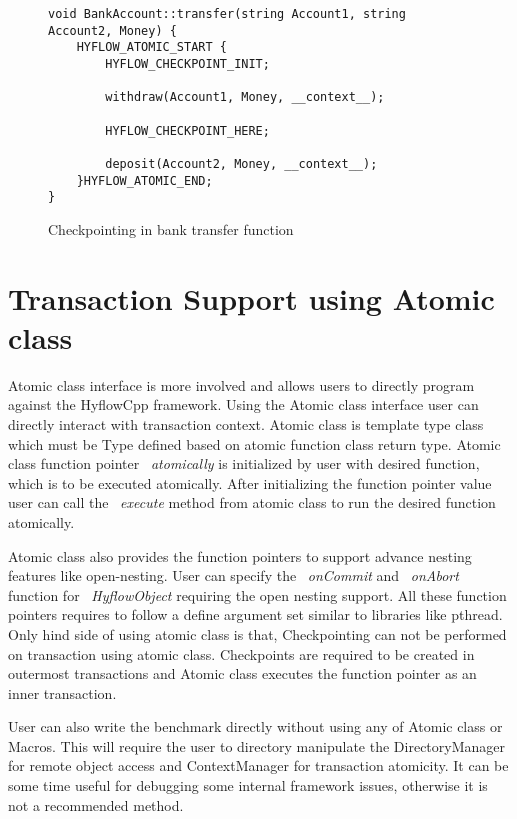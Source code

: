 \documentclass[12pt,english]{report}
\begin{document}
\begin{figure}
\begin{minipage}[b]{0.9\linewidth}\centering
\begin{lstlisting}
void BankAccount::transfer(string Account1, string Account2, Money) {
	HYFLOW_ATOMIC_START {
		HYFLOW_CHECKPOINT_INIT;

		withdraw(Account1, Money, __context__);

		HYFLOW_CHECKPOINT_HERE;
	
		deposit(Account2, Money, __context__);
	}HYFLOW_ATOMIC_END;
}
\end{lstlisting}
\end{minipage}
\caption{Checkpointing in bank transfer function}
\label{Fig:bankCP}
\end{figure}

\section{Transaction Support using Atomic class}

Atomic class interface is more involved and allows users to directly program against the HyflowCpp framework. Using the Atomic class interface user can directly interact with transaction context. Atomic class is template type class which must be Type defined based on atomic function class return type. Atomic class function pointer ~\emph{atomically} is initialized by user with desired function, which is to be executed atomically. After initializing the function pointer value user can call the ~\emph{execute} method from atomic class to run the desired function atomically.

Atomic class also provides the function pointers to support advance nesting features like open-nesting. User can specify the ~\emph{onCommit} and ~\emph{onAbort} function for  ~\emph{HyflowObject} requiring the open nesting support. All these function pointers requires to follow a define argument set similar to libraries like pthread. Only hind side of using atomic class is that, Checkpointing can not be performed on transaction using atomic class. Checkpoints are required to be created in outermost transactions and Atomic class executes the function pointer as an inner transaction. 

User can also write the benchmark directly without using any of Atomic class or Macros. This will require the user to directory manipulate the DirectoryManager for remote object access and ContextManager for transaction atomicity. It can be some time useful for debugging some internal framework issues, otherwise it is not a recommended method.
\end{document}
